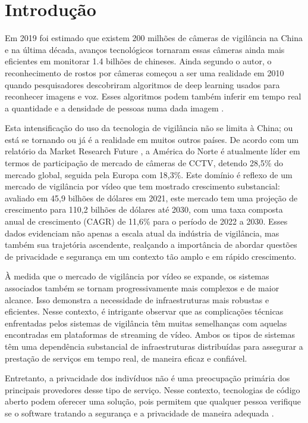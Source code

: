 \documentclass[12pt, %
openright, 
oneside, %
a4paper,    %
brazil]{facom-ufu-abntex2}
\begin{document}
\chapter[Introdução]{Introdução}
Em 2019 foi estimado que existem 200 milhões de câmeras de vigilância na China
e na última década, avanços tecnológicos tornaram essas câmeras ainda mais
eficientes em monitorar 1.4 bilhões de chineses. Ainda segundo o autor, o
reconhecimento de rostos por câmeras começou a ser uma realidade em 2010 quando
pesquisadores descobriram algoritmos de deep learning usados para reconhecer
imagens e voz. Esses algoritmos podem também inferir em tempo real a quantidade
e a densidade de pessoas numa dada imagem \cite{qiang2019road}.

Esta intensificação do uso da tecnologia de vigilância não se limita à China;
ou está se tornando ou já é a realidade em muitos outros países. De acordo com
um relatório da Market Research Future \cite{Gupta2018}, a América do Norte é
atualmente líder em termos de participação de mercado de câmeras de CCTV,
detendo 28,5\% do mercado global, seguida pela Europa com 18,3\%. Este domínio
é reflexo de um mercado de vigilância por vídeo que tem mostrado crescimento
substancial: avaliado em 45,9 bilhões de dólares em 2021, este mercado tem uma
projeção de crescimento para 110,2 bilhões de dólares até 2030, com uma taxa
composta anual de crescimento (CAGR) de 11,6\% para o período de 2022 a 2030.
Esses dados evidenciam não apenas a escala atual da indústria de vigilância,
mas também sua trajetória ascendente, realçando a importância de abordar
questões de privacidade e segurança em um contexto tão amplo e em rápido
crescimento.

À medida que o mercado de vigilância por vídeo se expande, os sistemas
associados também se tornam progressivamente mais complexos e de maior alcance.
Isso demonstra a necessidade de infraestruturas mais robustas e eficientes.
Nesse contexto, é intrigante observar que as complicações técnicas enfrentadas
pelos sistemas de vigilância têm muitas semelhanças com aquelas encontradas em
plataformas de streaming de vídeo. Ambos os tipos de sistemas têm uma
dependência substancial de infraestruturas distribuídas para assegurar a
prestação de serviços em tempo real, de maneira eficaz e confiável.

Entretanto, a privacidade dos indivíduos não é uma preocupação primária dos
principais provedores desse tipo de serviço. Nesse contexto, tecnologias de
código aberto podem oferecer uma solução, pois permitem que qualquer pessoa
verifique se o software tratando a segurança e a privacidade de maneira
adequada \cite{mardjan2016open}.
\end{document}
